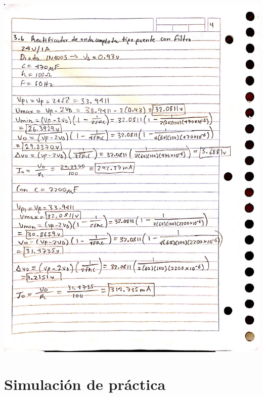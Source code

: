 \documentclass[12pt]{article}
\begin{document}
\begin{itemize}
\begin{center}
            \includegraphics*[scale=0.2]{an4.jpg}
        \end{center}\newpage




        \section*{Simulación de práctica}
        \label{sec:simulador}


\end{itemize}
\end{document}
